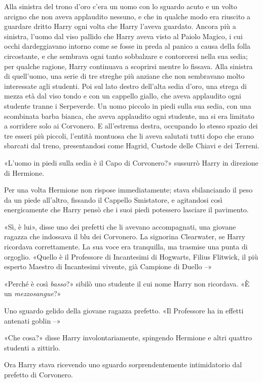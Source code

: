 Alla sinistra del trono d’oro c’era un uomo con lo sguardo acuto e un volto arcigno che non aveva applaudito nessuno, e che in qualche modo era riuscito a guardare dritto Harry ogni volta che Harry l’aveva guardato. Ancora più a sinistra, l’uomo dal viso pallido che Harry aveva visto al Paiolo Magico, i cui occhi dardeggiavano intorno come se fosse in preda al panico a causa della folla circostante, e che sembrava ogni tanto sobbalzare e contorcersi nella sua sedia; per qualche ragione, Harry continuava a scoprirsi mentre lo fissava. Alla sinistra di quell’uomo, una serie di tre streghe più anziane che non sembravano molto interessate agli studenti. Poi sul lato destro dell’alta sedia d’oro, una strega di mezza età dal viso tondo e con un cappello giallo, che aveva applaudito ogni studente tranne i Serpeverde. Un uomo piccolo in piedi sulla sua sedia, con una scombinata barba bianca, che aveva applaudito ogni studente, ma si era limitato a sorridere solo ai Corvonero. E all’estrema destra, occupando lo stesso spazio dei tre esseri più piccoli, l’entità montuosa che li aveva salutati tutti dopo che erano sbarcati dal treno, presentandosi come Hagrid, Custode delle Chiavi e dei Terreni.

«L’uomo in piedi sulla sedia è il Capo di Corvonero?» sussurrò Harry in direzione di Hermione.

Per una volta Hermione non rispose immediatamente; stava sbilanciando il peso da un piede all’altro, fissando il Cappello Smistatore, e agitandosi così energicamente che Harry pensò che i suoi piedi potessero lasciare il pavimento.

«Sì, è lui», disse uno dei prefetti che li avevano accompagnati, una giovane ragazza che indossava il blu dei Corvonero. La signorina Clearwater, se Harry ricordava correttamente. La sua voce era tranquilla, ma trasmise una punta di orgoglio. «Quello è il Professore di Incantesimi di Hogwarts, Filius Flitwick, il più esperto Maestro di Incantesimi vivente, già Campione di Duello –»

«Perché è così \textit{basso}?» sibilò uno studente il cui nome Harry non ricordava. «È un \textit{mezzosangue}?»

Uno sguardo gelido della giovane ragazza prefetto. «Il Professore ha in effetti antenati goblin –»

«Che cosa?» disse Harry involontariamente, spingendo Hermione e altri quattro studenti a zittirlo.

Ora Harry stava ricevendo uno sguardo sorprendentemente intimidatorio dal prefetto di Corvonero.

